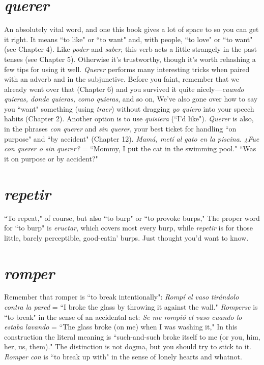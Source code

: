 \section{\emph{querer}}

An absolutely vital word, and one this book gives a lot of space
to so you can get it right. It means ``to like" or ``to want" and, with
people, ``to love" or ``to want" (see Chapter 4). Like \emph{poder} and \emph{saber},
this verb acts a little strangely in the past tenses (see Chapter 5). Otherwise it's trustworthy, though it's worth rehashing a few tips for using
it well. \emph{Querer} performs many interesting tricks when paired with an
adverb and in the subjunctive. Before you faint, remember that we already went over that (Chapter 6) and you survived it quite nicely---\emph{cuando quieras, donde quieras, como quieras}, and so on, We've also
gone over how to say you ``want" something (using \emph{traer}) without
dragging \emph{yo quiero} into your speech habits (Chapter 2). Another option
is to use \emph{quisiera} (``I'd like"). \emph{Querer} is also, in the phrases \emph{con querer}
and \emph{sin querer}, your best ticket for handling ``on purpose" and ``by
accident" (Chapter 12). \emph{Mamá, metí al gato en la piscina. ¿Fue con
querer o sin querer?} = ``Mommy, I put the cat in the swimming pool."
``Was it on purpose or by accident?"

\section{\emph{repetir}}

``To repeat," of course, but also ``to burp" or ``to provoke
burps," The proper word for ``to burp" is \emph{eructar}, which covers most
every burp, while \emph{repetir} is for those little, barely perceptible, good-eatin' burps. Just thought you'd want to know.

\section{\emph{romper}}

Remember that romper is ``to break intentionally": \emph{Rompí
el vaso tirándolo contra la pared} = ``I broke the glass by throwing it
against the wall." \emph{Romperse} is ``to break" in the sense of an accidental
act: \emph{Se me rompió el vaso cuando lo estaba lavando} = ``The glass
broke (on me) when I was washing it," In this construction the literal
meaning is ``such-and-such broke itself to me (or you, him, her, us,
them)." The distinction is not dogma, but you should try to stick to
it. \emph{Romper con} is ``to break up with" in the sense of lonely hearts and
whatnot.

